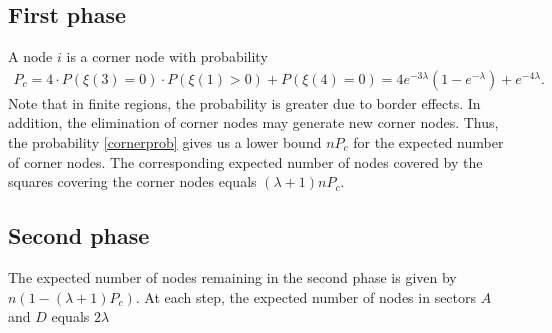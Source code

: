 \documentclass{article}
\begin{document}
\subsection{First phase}
A node $i$ is a corner node with probability 
\begin{align}
\label{cornerprob}
P_c=4 \cdot P(\xi(3)=0) \cdot P(\xi(1) > 0) + P(\xi(4)=0) = 4 e^{-3 \lambda} (1-e^{-\lambda}) + e^{-4 \lambda}.
\end{align}
Note that in finite regions, the probability is greater due to border effects. In addition,
the elimination of corner nodes may generate new corner nodes. 
Thus, the probability \eqref{cornerprob} gives us a lower bound $nP_c$ for the expected number of corner nodes. 
The corresponding expected number of nodes covered by the squares covering the corner nodes equals $(\lambda + 1) n P_c$.

\subsection{Second phase}
The expected number of nodes remaining in the second phase is given by $n(1-(\lambda + 1)P_c)$. At each step,
the expected number of nodes in sectors $A$ and $D$ equals $2 \lambda$
\end{document}
